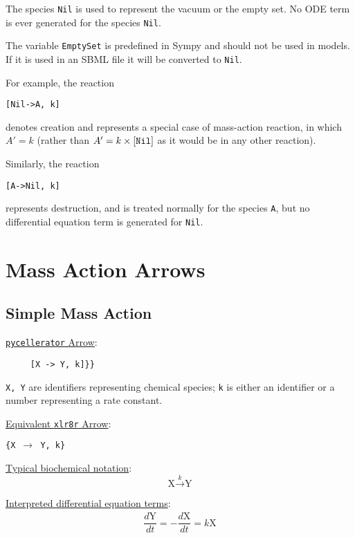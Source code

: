 The species {\tt Nil} is used to represent the vacuum or the empty set. No ODE term is ever generated for the species {\tt Nil}. 

The variable {\tt EmptySet} is predefined in Sympy and should not be used in models. If it is used in an SBML file it will be converted to {\tt Nil}. 


For example, the reaction
\begin{lstlisting}
[Nil->A, k]
\end{lstlisting}
denotes creation and represents a special case of mass-action reaction, in which $A'=k$ (rather than $A'=k\times\tt{[Nil]}$ as it would be in any other reaction). 

Similarly, the reaction
\begin{lstlisting}
[A->Nil, k]
\end{lstlisting}

represents destruction, and is treated normally for the species {\tt A}, but no differential equation term is generated for {\tt Nil}.
\section{Mass Action Arrows}

\subsection{Simple Mass Action}
\label{section:Simple-Mass-Action}

\underline{{\tt pycellerator} Arrow}: 
\begin{lstlisting}
     [X -> Y, k]}}
\end{lstlisting}

{\tt X, Y} are identifiers representing chemical species;  {\tt k} is either an identifier or a number representing a rate constant. 

\underline{Equivalent {\tt xlr8r} Arrow}: \begin{center}
{\tt \{X $\to$ Y, k\}}
\end{center}

\underline{Typical biochemical notation}: $$\text{X} \overset{k}{\to} \text{Y}$$

\underline{Interpreted differential equation terms}: 
\begin{align*}
\dfrac{d\text{Y}}{dt} = 
-\dfrac{d\text{X}}{dt} = k \text{X}
\end{align*}



